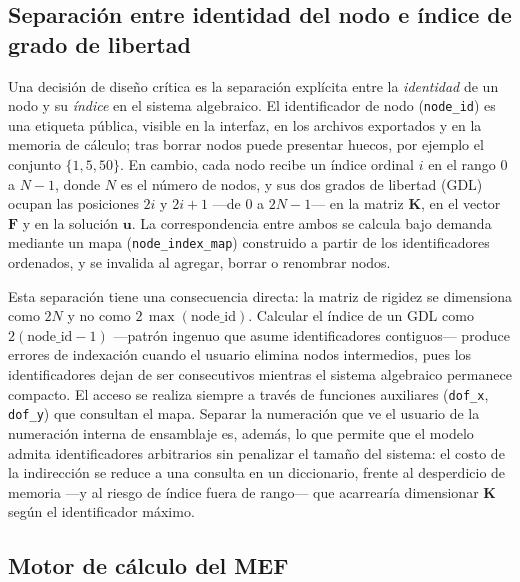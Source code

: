 \subsection{Separación entre identidad del nodo e índice de grado de libertad}
\label{sec:identidad-gdl}

Una decisión de diseño crítica es la separación explícita entre la \emph{identidad} de un nodo y su \emph{índice} en el sistema algebraico. El identificador de nodo (\texttt{node\_id}) es una etiqueta pública, visible en la interfaz, en los archivos exportados y en la memoria de cálculo; tras borrar nodos puede presentar huecos, por ejemplo el conjunto $\{1, 5, 50\}$. En cambio, cada nodo recibe un índice ordinal $i$ en el rango $0$ a $N-1$, donde $N$ es el número de nodos, y sus dos grados de libertad (GDL) ocupan las posiciones $2i$ y $2i+1$ —de $0$ a $2N-1$— en la matriz $\bm{K}$, en el vector $\bm{F}$ y en la solución $\bm{u}$. La correspondencia entre ambos se calcula bajo demanda mediante un mapa (\texttt{node\_index\_map}) construido a partir de los identificadores ordenados, y se invalida al agregar, borrar o renombrar nodos.

Esta separación tiene una consecuencia directa: la matriz de rigidez se dimensiona como $2N$ y no como $2\,\max(\text{node\_id})$. Calcular el índice de un GDL como $2(\text{node\_id}-1)$ —patrón ingenuo que asume identificadores contiguos— produce errores de indexación cuando el usuario elimina nodos intermedios, pues los identificadores dejan de ser consecutivos mientras el sistema algebraico permanece compacto. El acceso se realiza siempre a través de funciones auxiliares (\texttt{dof\_x}, \texttt{dof\_y}) que consultan el mapa. Separar la numeración que ve el usuario de la numeración interna de ensamblaje es, además, lo que permite que el modelo admita identificadores arbitrarios sin penalizar el tamaño del sistema: el costo de la indirección se reduce a una consulta en un diccionario, frente al desperdicio de memoria —y al riesgo de índice fuera de rango— que acarrearía dimensionar $\bm{K}$ según el identificador máximo.

\subsection{Motor de cálculo del MEF}
\label{sec:motor}

